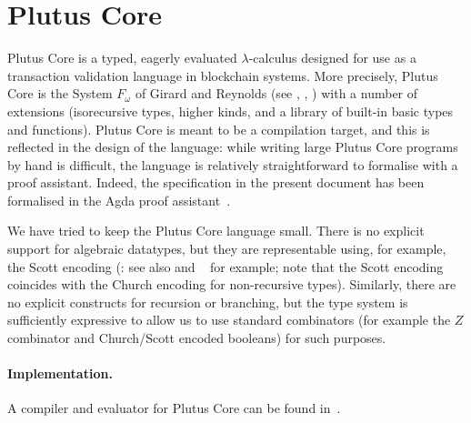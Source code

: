 \documentclass[a4paper]{article}
\begin{document}
%


\maketitle

\thispagestyle{plain}
\pagestyle{plain}



\section{Plutus Core}
Plutus Core is a typed, eagerly evaluated $\lambda$-calculus designed
for use as a transaction validation language in blockchain
systems. More precisely, Plutus Core is the System $F_\omega$ of
Girard and Reynolds (see \citep{Girard-thesis},
\citep{Reynolds-type-structure}, \citep[\S30]{Pierce:TAPL}) with a
number of extensions (isorecursive types, higher kinds, and a library
of built-in basic types and functions).  Plutus Core is meant to be a
compilation target, and this is reflected in the design of the
language: while writing large Plutus Core programs by hand is
difficult, the language is relatively straightforward to formalise
with a proof assistant.  Indeed, the specification in the present
document has been formalised in the Agda proof assistant~\citep{Agda}.

We have tried to keep the Plutus Core language small. There is no
explicit support for algebraic datatypes, but they are representable
using, for example, the Scott encoding (\citep{Scott-encoding}: see
also \citep{Koopman:2014} and ~\citep{Geuvers-2014} for example; note that
the Scott encoding coincides with the Church encoding for
non-recursive types). Similarly, there are no explicit constructs for
recursion or branching, but the type system is sufficiently expressive
to allow us to use standard combinators (for example the $Z$
combinator and Church/Scott encoded booleans) for such purposes.

\paragraph{Implementation.} A compiler and evaluator for Plutus Core can be found
in~\citep{Plutus-exe-repo}.
\end{document}
